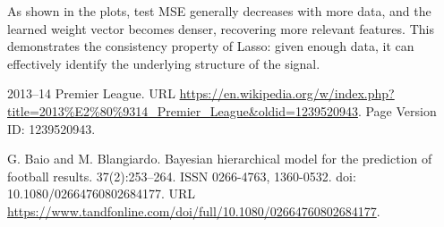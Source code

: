 \documentclass{article}
\begin{document}
As shown in the plots, test MSE generally decreases with more data, and the learned weight vector becomes denser, recovering more relevant features. This demonstrates the consistency property of Lasso: given enough data, it can effectively identify the underlying structure of the signal.


\begin{thebibliography}{99}
 2013–14 Premier League. URL \url{https://en.wikipedia.org/w/index.php?title=2013%E2%80%9314_Premier_League&oldid=1239520943}. Page Version ID: 1239520943.

 G. Baio and M. Blangiardo. Bayesian hierarchical model for the prediction of football results. 37(2):253–264. ISSN 0266-4763, 1360-0532. doi: 10.1080/02664760802684177. URL \url{https://www.tandfonline.com/doi/full/10.1080/02664760802684177}.
\end{thebibliography}
\end{document}
